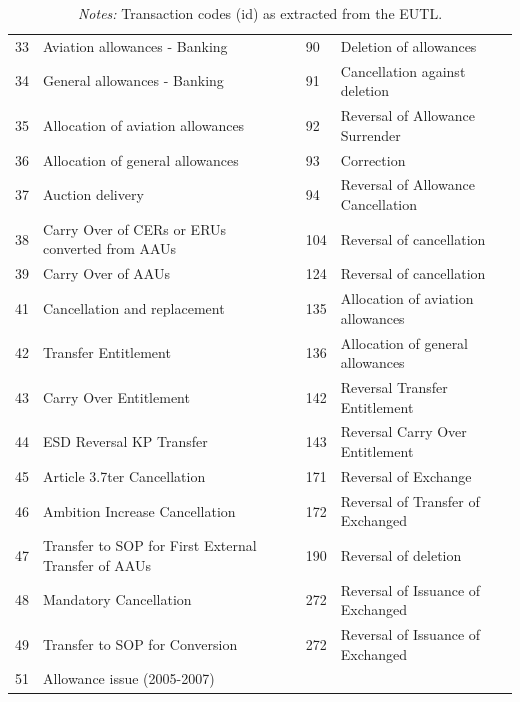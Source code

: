 \documentclass[authoryear]{elsarticle}
\begin{document}
\begin{table}[htbp]
\begin{tabular*}{\textwidth}{@{}@{\extracolsep{\fill}} lp{4cm}clp{3cm} @{}}
		33    & Aviation allowances - Banking &       & 90    & \multicolumn{1}{l}{Deletion of allowances} \\
		34    & General allowances - Banking &       & 91    & \multicolumn{1}{l}{Cancellation against deletion} \\
		35    & Allocation of aviation allowances &       & 92    & \multicolumn{1}{l}{Reversal of Allowance Surrender} \\
		36    & Allocation of general allowances &       & 93    & \multicolumn{1}{l}{Correction} \\
		37    & Auction delivery &       & 94    & \multicolumn{1}{l}{Reversal of Allowance Cancellation} \\
		38    & Carry Over of CERs or ERUs converted from AAUs &       & 104   & \multicolumn{1}{l}{Reversal of cancellation} \\
		39    & Carry Over of AAUs &       & 124   & \multicolumn{1}{l}{Reversal of cancellation} \\
		41    & Cancellation and replacement &       & 135   & \multicolumn{1}{l}{Allocation of aviation allowances} \\
		42    & Transfer Entitlement &       & 136   & \multicolumn{1}{l}{Allocation of general allowances} \\
		43    & Carry Over Entitlement &       & 142   & \multicolumn{1}{l}{Reversal Transfer Entitlement} \\
		44    & ESD Reversal KP Transfer &       & 143   & \multicolumn{1}{l}{Reversal Carry Over Entitlement} \\
		45    & Article 3.7ter Cancellation &       & 171   & \multicolumn{1}{l}{Reversal of Exchange} \\
		46    & Ambition Increase Cancellation &       & 172   & \multicolumn{1}{l}{Reversal of Transfer of Exchanged} \\
		47    & Transfer to SOP for First External Transfer of AAUs &       & 190   & \multicolumn{1}{l}{Reversal of deletion} \\
		48    & Mandatory Cancellation &       & 272   & \multicolumn{1}{l}{Reversal of Issuance of Exchanged} \\
		49    & Transfer to SOP for Conversion &       & 272   & \multicolumn{1}{l}{Reversal of Issuance of Exchanged} \\
		51    & Allowance issue (2005-2007) &       &       &  \\
		\bottomrule
		\bottomrule
	\end{tabular*}%
	\vspace{-3ex}
	\caption*{\footnotesize \emph{Notes:} Transaction codes (id) as extracted from the EUTL.}
	\vspace{0ex}
\end{table}%
\end{document}
